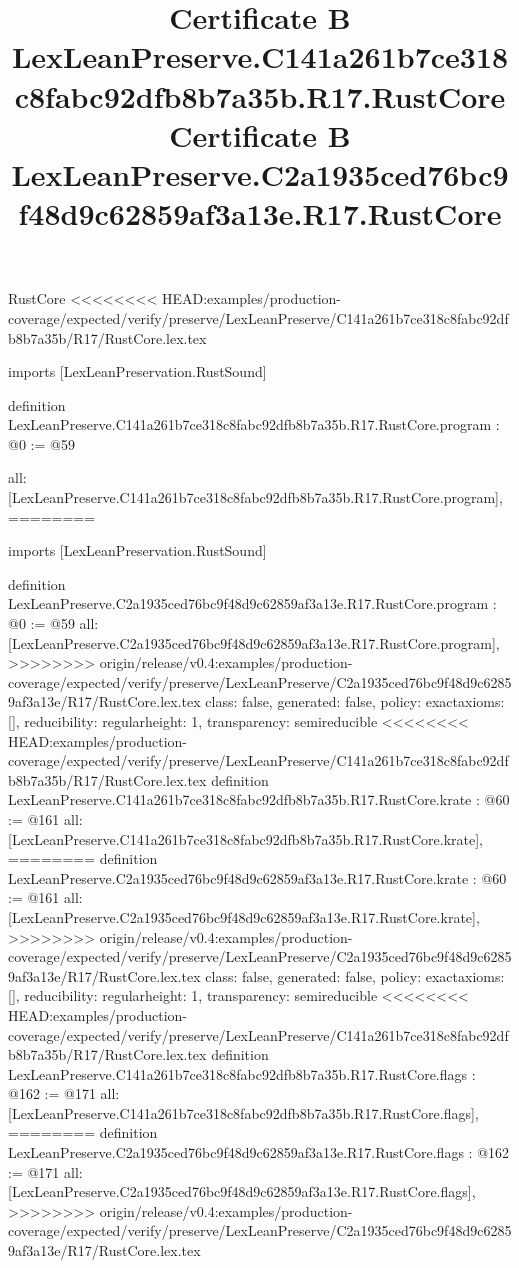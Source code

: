 \begin{lexlean}{RustCore}
<<<<<<<< HEAD:examples/production-coverage/expected/verify/preserve/LexLeanPreserve/C141a261b7ce318c8fabc92dfb8b7a35b/R17/RustCore.lex.tex
\title{Certificate B LexLeanPreserve.C141a261b7ce318c8fabc92dfb8b7a35b.R17.RustCore}
\begin{coremodule}
imports [LexLeanPreservation.RustSound]

definition LexLeanPreserve.C141a261b7ce318c8fabc92dfb8b7a35b.R17.RustCore.program : @0 := @59 {
  all: [LexLeanPreserve.C141a261b7ce318c8fabc92dfb8b7a35b.R17.RustCore.program],
========
\title{Certificate B LexLeanPreserve.C2a1935ced76bc9f48d9c62859af3a13e.R17.RustCore}
\begin{coremodule}
imports [LexLeanPreservation.RustSound]

definition LexLeanPreserve.C2a1935ced76bc9f48d9c62859af3a13e.R17.RustCore.program : @0 := @59 {
  all: [LexLeanPreserve.C2a1935ced76bc9f48d9c62859af3a13e.R17.RustCore.program],
>>>>>>>> origin/release/v0.4:examples/production-coverage/expected/verify/preserve/LexLeanPreserve/C2a1935ced76bc9f48d9c62859af3a13e/R17/RustCore.lex.tex
  class: false,
  generated: false,
  policy: exact{axioms: []},
  reducibility: regular{height: 1},
  transparency: semireducible
}
<<<<<<<< HEAD:examples/production-coverage/expected/verify/preserve/LexLeanPreserve/C141a261b7ce318c8fabc92dfb8b7a35b/R17/RustCore.lex.tex
definition LexLeanPreserve.C141a261b7ce318c8fabc92dfb8b7a35b.R17.RustCore.krate : @60 := @161 {
  all: [LexLeanPreserve.C141a261b7ce318c8fabc92dfb8b7a35b.R17.RustCore.krate],
========
definition LexLeanPreserve.C2a1935ced76bc9f48d9c62859af3a13e.R17.RustCore.krate : @60 := @161 {
  all: [LexLeanPreserve.C2a1935ced76bc9f48d9c62859af3a13e.R17.RustCore.krate],
>>>>>>>> origin/release/v0.4:examples/production-coverage/expected/verify/preserve/LexLeanPreserve/C2a1935ced76bc9f48d9c62859af3a13e/R17/RustCore.lex.tex
  class: false,
  generated: false,
  policy: exact{axioms: []},
  reducibility: regular{height: 1},
  transparency: semireducible
}
<<<<<<<< HEAD:examples/production-coverage/expected/verify/preserve/LexLeanPreserve/C141a261b7ce318c8fabc92dfb8b7a35b/R17/RustCore.lex.tex
definition LexLeanPreserve.C141a261b7ce318c8fabc92dfb8b7a35b.R17.RustCore.flags : @162 := @171 {
  all: [LexLeanPreserve.C141a261b7ce318c8fabc92dfb8b7a35b.R17.RustCore.flags],
========
definition LexLeanPreserve.C2a1935ced76bc9f48d9c62859af3a13e.R17.RustCore.flags : @162 := @171 {
  all: [LexLeanPreserve.C2a1935ced76bc9f48d9c62859af3a13e.R17.RustCore.flags],
>>>>>>>> origin/release/v0.4:examples/production-coverage/expected/verify/preserve/LexLeanPreserve/C2a1935ced76bc9f48d9c62859af3a13e/R17/RustCore.lex.tex
}}}
\end{coremodule}}
\end{coremodule}
\end{lexlean}
